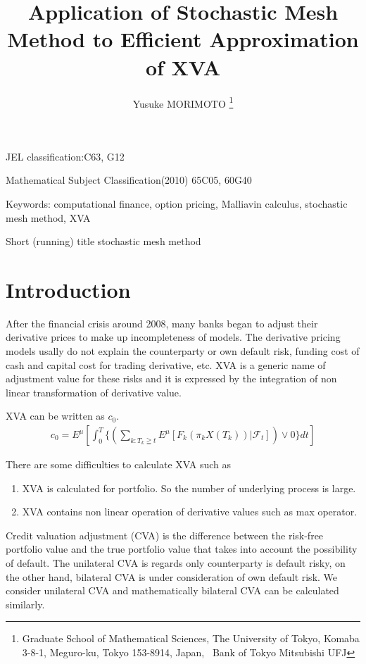 \documentclass[12pt]{article}
\begin{document}
\title{Application of Stochastic Mesh Method to Efficient Approximation of XVA}
 
\author{
Yusuke MORIMOTO
\thanks{
Graduate School of Mathematical Sciences, 
The University of Tokyo, 
Komaba 3-8-1, Meguro-ku, Tokyo 153-8914, Japan, \
Bank of Tokyo Mitsubishi UFJ }
}
\date{}

\maketitle
\begin{abstract}
\end{abstract}

JEL classification:C63, G12

Mathematical Subject Classification(2010)   65C05,  60G40

Keywords:  computational finance, option pricing, Malliavin calculus, 
stochastic mesh method, XVA

Short (running) title stochastic mesh method

\section{Introduction}
After the financial crisis around 2008,  many banks began to adjust their derivative prices to make up incompleteness of models.
The derivative pricing models usally do not explain
the counterparty or own default risk, funding cost of cash and
capital cost for trading derivative, etc.
XVA is a generic name of adjustment value for these risks and 
it is expressed by the integration of non linear transformation of 
derivative value.

XVA can be written as $c_0$.
\begin{align}
c_0 = E^{\mu}[\int_{0}^T \{( \sum_{k:T_k\geqq t} E^{\mu}[F_k(\pi_k{X}(T_k)) |\mathcal{F}_t])\vee0\}dt ]
\end{align}

There are some difficulties to calculate XVA such as 
\begin{enumerate}
	\item XVA is calculated for portfolio. So the number of underlying process is large.
	\item XVA contains non linear operation of derivative values such as max operator.
\end{enumerate}
Credit valuation adjustment (CVA) is the  difference between the risk-free portfolio value and the true portfolio value that takes into account the possibility of  default.
The unilateral CVA is regards only counterparty is default risky, on the other hand, bilateral CVA is under consideration of  own default risk.
We consider unilateral CVA and mathematically bilateral CVA can be calculated similarly.
\end{document}
